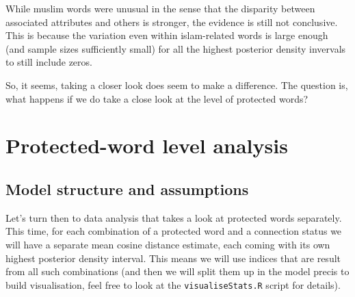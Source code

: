 \documentclass[12pt,]{book}
\begin{document}
\normalsize

While muslim words were unusual in the sense that the disparity between
associated attributes and others is stronger, the evidence is still not
conclusive. This is because the variation even within islam-related
words is large enough (and sample sizes sufficiently small) for all the
highest posterior density invervals to still include zeros.

So, it seems, taking a closer look does seem to make a difference. The
question is, what happens if we do take a close look at the level of
protected words?

\chapter{Protected-word level
analysis}\label{protected-word-level-analysis}

\section{Model structure and
assumptions}\label{model-structure-and-assumptions}

Let's turn then to data analysis that takes a look at protected words
separately. This time, for each combination of a protected word and a
connection status we will have a separate mean cosine distance estimate,
each coming with its own highest posterior density interval. This means
we will use indices that are result from all such combinations (and then
we will split them up in the model precis to build visualisation, feel
free to look at the \texttt{visualiseStats.R} script for details).

\vspace{1mm} \footnotesize
\end{document}
